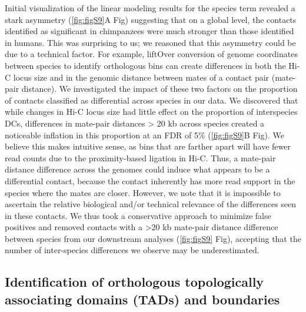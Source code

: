 Initial visualization of the linear modeling results for the species term revealed a stark asymmetry (\ref{fig:figS9}A Fig) suggesting that on a global level, the contacts identified as significant in chimpanzees were much stronger than those identified in humans. This was surprising to us; we reasoned that this asymmetry could be due to a technical factor. For example, liftOver conversion of genome coordinates between species to identify orthologous bins can create differences in both the Hi-C locus size and in the genomic distance between mates of a contact pair (mate-pair distance). We investigated the impact of these two factors on the proportion of contacts classified as differential across species in our data. We discovered that while changes in Hi-C locus size had little effect on the proportion of interspecies DCs, differences in mate-pair distances {\textgreater} 20 kb across species created a noticeable inflation in this proportion at an FDR of 5\% (\ref{fig:figS9}B Fig). We believe this makes intuitive sense, as bins that are farther apart will have fewer read counts due to the proximity-based ligation in Hi-C. Thus, a mate-pair distance difference across the genomes could induce what appears to be a differential contact, because the contact inherently has more read support in the species where the mates are closer. However, we note that it is impossible to ascertain the relative biological and/or technical relevance of the differences seen in these contacts. We thus took a conservative approach to minimize false positives and removed contacts with a {\textgreater}20 kb mate-pair distance difference between species from our downstream analyses (\ref{fig:figS9} Fig), accepting that the number of inter-species differences we observe may be underestimated.

\subsection{Identification of orthologous topologically associating domains (TADs) and boundaries}

